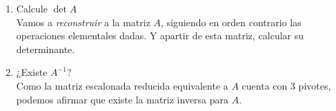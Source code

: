     \begin{enumerate}[label=\listAlph]
        \item Calcule \(\det A\) \\
            Vamos a \emph{reconstruir} a la matriz \(A\), siguiendo en orden contrario las operaciones elementales dadas. 
            Y apartir de esta matriz, calcular su determinante.
        \item ¿Existe \(A^{-1}\)? \\
            Como la matriz escalonada reducida equivalente a \(A\) cuenta con 3 pivotes, podemos afirmar que existe la matriz inversa para \(A\).

\end{enumerate}
